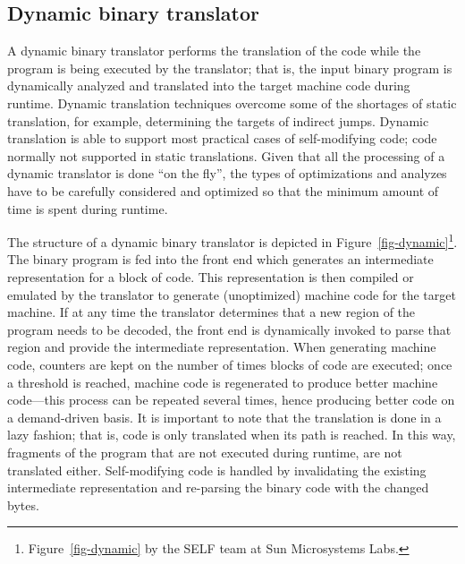  
\subsection{Dynamic binary translator}
A dynamic binary translator performs the translation of the code while 
the program is being executed by the translator; that is, the input 
binary program is dynamically analyzed and translated into the target 
machine code during runtime.
Dynamic translation techniques overcome some of the shortages of static
translation, for example, determining the targets of indirect jumps.
Dynamic translation is able to support most practical cases of 
self-modifying code; code normally not supported in static translations.
Given that all the processing of a dynamic translator is done ``on the
fly'', the types of optimizations and analyzes have to be carefully
considered and optimized so that the minimum amount of time is spent
during runtime.
 
The structure of a dynamic binary translator is depicted in
Figure~\ref{fig-dynamic}\footnote{
Figure~\ref{fig-dynamic} by the SELF team at Sun Microsystems Labs.}.  
The binary program is fed into the front end which generates an 
intermediate representation for a block of code.  This representation 
is then compiled or emulated by the translator to generate
(unoptimized) machine code for the target machine.  If at any time the
translator determines that a new region of the program needs to be decoded,
the front end is dynamically invoked to parse that region and provide the
intermediate representation.  When generating machine code, counters are
kept on the number of times blocks of code are executed; once a threshold is
reached, machine code is regenerated to produce better machine code---this
process can be repeated several times, hence producing better code on a
demand-driven basis.  It is important to note that the translation is done
in a lazy fashion; that is, code is only translated when its path is reached.
In this way, fragments of the program that are not executed during runtime,
are not translated either.  Self-modifying code is handled by
invalidating the existing intermediate representation and re-parsing
the binary code with the changed bytes.
 
